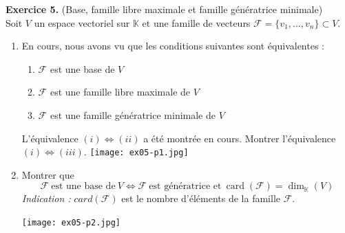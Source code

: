 \documentclass[a4paper, 10pt]{report}
\DeclareMathOperator{\card}{card}
\begin{document}
	\newpage
	
	\noindent
	\textbf{Exercice 5.} (Base, famille libre maximale et famille
	génératrice minimale)\\
	Soit $V$ un espace vectoriel sur $\mathbb{K}$ et une famille
	de vecteurs $\mathcal{F} = \{v_1, \dotsc, v_n\} \subset V$.
	
	\begin{enumerate}[label=(\alph*)]
		\item En cours, nous avons vu que les conditions suivantes
		sont équivalentes :
		\begin{enumerate}[label=(\roman*)]
			\item $\mathcal{F}$ est une base de $V$
			\item $\mathcal{F}$ est une famille
				libre maximale de $V$
			\item $\mathcal{F}$ est une famille
				génératrice minimale de $V$
		\end{enumerate}
		L'équivalence $(i) \iff (ii)$ a été montrée en cours.
		Montrer l'équivalence $(i) \iff (iii)$.
		\texttt{[image: ex05-p1.jpg]}
		\item Montrer que
		\[
			\mathcal{F}\ \text{est une base de}\ V \iff
			\mathcal{F}\ \text{est génératrice et}\
			\card(\mathcal{F}) = \dim_{\mathbb{K}}(V)
		\]
		\textit{Indication :} $card(\mathcal{F})$ est le nombre
		d'éléments de la famille $\mathcal{F}$.
		
		\texttt{[image: ex05-p2.jpg]}
	\end{enumerate}
	
\end{document}
